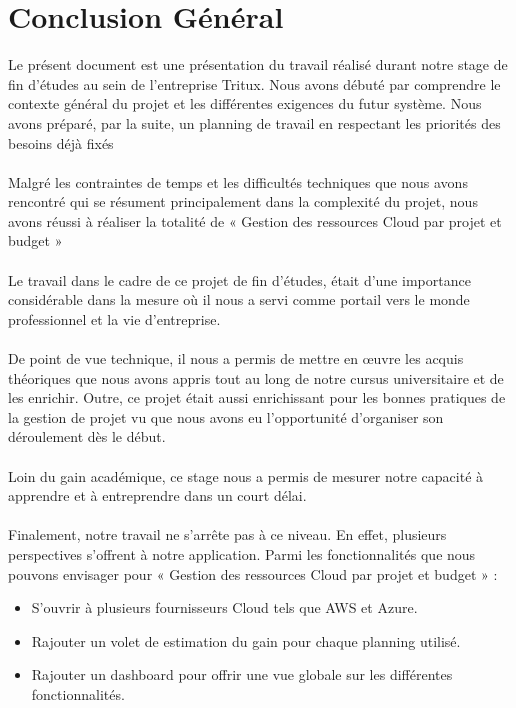 \chapter*{Conclusion Général}
Le présent document est une présentation du travail réalisé durant notre stage de fin d'études
au sein de l'entreprise Tritux. Nous avons débuté par comprendre le contexte général du
projet et les différentes exigences du futur système. Nous avons préparé, par la suite, un planning de
travail en respectant les priorités des besoins déjà fixés  \\ \\ Malgré les contraintes de
temps et les difficultés techniques que nous avons rencontré qui se résument principalement dans la
complexité du projet, nous avons réussi à réaliser la totalité de « Gestion des ressources Cloud par projet et budget »\\ \\ Le travail dans le cadre de ce projet de fin d'études, était d'une importance considérable dans la mesure où il nous
a servi comme portail vers le monde professionnel et la vie d'entreprise. \\ \\ De point de vue technique,
il nous a permis de mettre en \oe uvre les acquis théoriques que nous avons appris tout au long de
notre cursus universitaire et de les enrichir. Outre, ce projet était aussi enrichissant pour les bonnes
pratiques de la gestion de projet vu que nous avons eu l'opportunité d'organiser son déroulement
dès le début.\\ \\Loin du gain académique, ce stage nous a permis de mesurer notre capacité à apprendre et à entreprendre dans un court délai.\\ \\
Finalement, notre travail ne s'arrête pas à ce niveau. En effet, plusieurs perspectives s'offrent à notre
application.
Parmi les fonctionnalités que nous pouvons envisager pour « Gestion des ressources Cloud par projet et budget » :

\begin{itemize}
	\item S'ouvrir à plusieurs fournisseurs Cloud  tels que AWS et Azure.
	\item Rajouter un volet de estimation du gain pour chaque planning utilisé.
	\item Rajouter un dashboard pour offrir une vue globale sur les différentes fonctionnalités.
\end{itemize}
